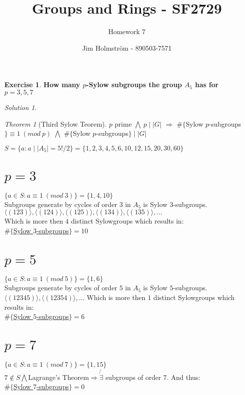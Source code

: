 \documentclass[a4paper,twoside=false,abstract=false,numbers=noenddot,
titlepage=false,headings=small,parskip=half,version=last]{scrartcl}
\author{Jim Holmström - 890503-7571}
\title{Groups and Rings - SF2729}
\subtitle{Homework 7}
\theoremstyle{definition}
\newtheorem{exercise}{Exercise}
\theoremstyle{remark}
\newtheorem*{solution}{Solution}
\newtheorem{theorem}{Theorem}[section]
\begin{document}
\maketitle
\thispagestyle{empty}

\begin{exercise}
{\bf
How many $p$-Sylow subgroups the group $A_5$ has for $p=3,5,7$
}
\end{exercise}
\begin{solution}

\begin{theorem}[Third Sylow Teorem]
   $p$ prime $\bigwedge \: p \mid |G|$ 
   $\Rightarrow$
   $\#\{$Sylow $p$-subgroups$\} \equiv 1 \:( mod \: p)$
   $\bigwedge$
   $\#\{$Sylow $p$-subgroups$\} \mid |G|$ 
\end{theorem}

$S=\{a : a \mid |A_5|=5!/2\}=\{1,2,3,4,5,6,10,12,15,20,30,60\}$

\section{$p=3$}
$\{ a \in S: a \equiv 1 \:(mod\: 3) \}=\{1,4,10\}$\\
Subgroups generate by cycles of order $3$ in $A_5$ is Sylow $3$-subgroups.\\
$\langle (123) \rangle, \langle (124) \rangle, \langle (125) \rangle,
 \langle (134) \rangle, \langle (135) \rangle, \ldots $ \\
Which is more then $4$ distinct Sylowgroups which results in:\\ 
\underline{
    $\#\{$Sylow $3$-subgroups$\}=10$    
}

\section{$p=5$}
$\{ a \in S: a \equiv 1 \:(mod\: 5) \}=\{1,6\}$\\
Subgroups generate by cycles of order $5$ in $A_5$ is Sylow $5$-subgroups.\\
$\langle (12345) \rangle, \langle (12354) \rangle, \ldots $
Which is more then $1$ distinct Sylowgroups which results in:\\ 
\underline{
    $\#\{$Sylow $5$-subgroups$\}=6$    
}

\section{$p=7$}
$\{ a \in S: a \equiv 1 \:(mod\: 7) \}=\{1,15\}$\\
$7 \notin S \bigwedge $Lagrange's Theorem$ \Rightarrow \not{\exists}$ subgroups of order $7$.
And thus:\\
\underline{
    $\#\{$Sylow $7$-subgroups$\}=0$    
}

\end{solution}

\end{document}
